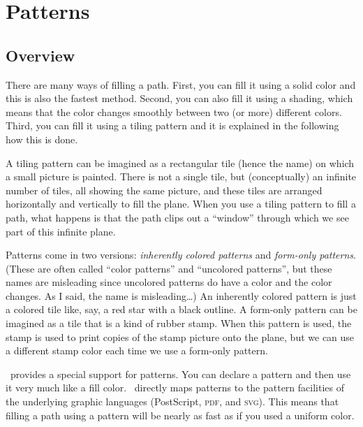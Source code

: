 %
%
%


\section{Patterns}
\label{section-patterns}

\subsection{Overview}

There are many ways of filling a path. First, you can fill it using a solid
color and this is also the fastest method. Second, you can also fill it using a
shading, which means that the color changes smoothly between two (or more)
different colors. Third, you can fill it using a tiling pattern and it is
explained in the following how this is done.

A tiling pattern can be imagined as a rectangular tile (hence the name) on
which a small picture is painted. There is not a single tile, but
(conceptually) an infinite number of tiles, all showing the same picture, and
these tiles are arranged horizontally and vertically to fill the plane. When
you use a tiling pattern to fill a path, what happens is that the path clips
out a ``window'' through which we see part of this infinite plane.

Patterns come in two versions: \emph{inherently colored patterns} and
\emph{form-only patterns}. (These are often called ``color patterns'' and
``uncolored patterns'', but these names are misleading since uncolored patterns
do have a color and the color changes. As I said, the name is misleading\dots)
An inherently colored pattern is just a colored tile like, say, a red star with
a black outline. A form-only pattern can be imagined as a tile that is a kind
of rubber stamp. When this pattern is used, the stamp is used to print copies
of the stamp picture onto the plane, but we can use a different stamp color
each time we use a form-only pattern.

\pgfname\ provides a special support for patterns. You can declare a pattern
and then use it very much like a fill color. \pgfname\ directly maps patterns
to the pattern facilities of the underlying graphic languages (PostScript,
\textsc{pdf}, and \textsc{svg}). This means that filling a path using a pattern
will be nearly as fast as if you used a uniform color.


